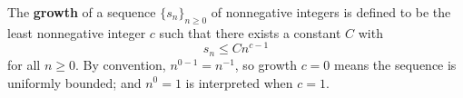 \begin{definition}
\label{def:growth-of-sequence}
The \textbf{growth} of a sequence $\{s_n\}_{n \geq 0}$ of nonnegative integers is defined to be the least nonnegative integer $c$ such that there exists a constant $C$ with
$$
s_n \leq C n^{c-1}
$$
for all $n \geq 0$. By convention, $n^{0-1} = n^{-1}$, so growth $c = 0$ means the sequence is uniformly bounded; and $n^{0} = 1$ is interpreted when $c = 1$.
\end{definition}
